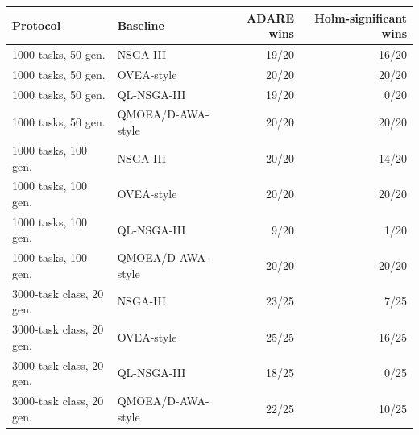 \begin{tabular}{llrr}
\toprule
Protocol & Baseline & ADARE wins & Holm-significant wins \\
\midrule
1000 tasks, 50 gen. & NSGA-III & 19/20 & 16/20 \\
1000 tasks, 50 gen. & OVEA-style & 20/20 & 20/20 \\
1000 tasks, 50 gen. & QL-NSGA-III & 19/20 & 0/20 \\
1000 tasks, 50 gen. & QMOEA/D-AWA-style & 20/20 & 20/20 \\
1000 tasks, 100 gen. & NSGA-III & 20/20 & 14/20 \\
1000 tasks, 100 gen. & OVEA-style & 20/20 & 20/20 \\
1000 tasks, 100 gen. & QL-NSGA-III & 9/20 & 1/20 \\
1000 tasks, 100 gen. & QMOEA/D-AWA-style & 20/20 & 20/20 \\
3000-task class, 20 gen. & NSGA-III & 23/25 & 7/25 \\
3000-task class, 20 gen. & OVEA-style & 25/25 & 16/25 \\
3000-task class, 20 gen. & QL-NSGA-III & 18/25 & 0/25 \\
3000-task class, 20 gen. & QMOEA/D-AWA-style & 22/25 & 10/25 \\
\bottomrule
\end{tabular}

